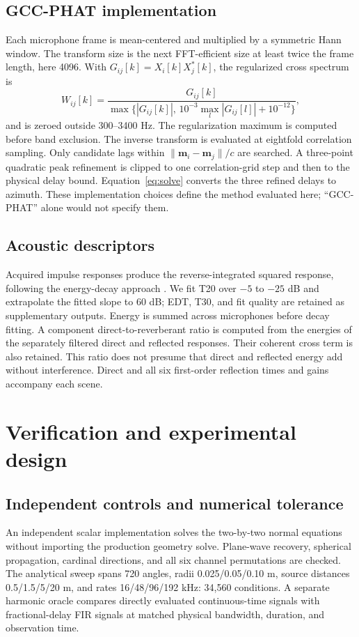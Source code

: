 \documentclass[10pt,a4paper,twocolumn]{article}
\begin{document}
\subsection{GCC-PHAT implementation}
Each microphone frame is mean-centered and multiplied by a symmetric Hann window. The transform size is the next FFT-efficient size at least twice the frame length, here 4096. With $G_{ij}[k]=X_i[k]X_j^*[k]$, the regularized cross spectrum is
\begin{equation}
 W_{ij}[k]=\frac{G_{ij}[k]}{\max\{|G_{ij}[k]|,\,10^{-3}\max_l|G_{ij}[l]|+10^{-12}\}},
\end{equation}
and is zeroed outside 300--3400 Hz. The regularization maximum is computed before band exclusion. The inverse transform is evaluated at eightfold correlation sampling. Only candidate lags within $\|\mathbf m_i-\mathbf m_j\|/c$ are searched. A three-point quadratic peak refinement is clipped to one correlation-grid step and then to the physical delay bound. Equation~\ref{eq:solve} converts the three refined delays to azimuth. These implementation choices define the method evaluated here; ``GCC-PHAT'' alone would not specify them.

\subsection{Acoustic descriptors}
Acquired impulse responses produce the reverse-integrated squared response, following the energy-decay approach \citep{schroeder}. We fit T20 over $-5$ to $-25$ dB and extrapolate the fitted slope to 60 dB; EDT, T30, and fit quality are retained as supplementary outputs. Energy is summed across microphones before decay fitting. A component direct-to-reverberant ratio is computed from the energies of the separately filtered direct and reflected responses. Their coherent cross term is also retained. This ratio does not presume that direct and reflected energy add without interference. Direct and all six first-order reflection times and gains accompany each scene.

\section{Verification and experimental design}
\subsection{Independent controls and numerical tolerance}
An independent scalar implementation solves the two-by-two normal equations without importing the production geometry solve. Plane-wave recovery, spherical propagation, cardinal directions, and all six channel permutations are checked. The analytical sweep spans 720 angles, radii 0.025/0.05/0.10 m, source distances 0.5/1.5/5/20 m, and rates 16/48/96/192 kHz: 34,560 conditions. A separate harmonic oracle compares directly evaluated continuous-time signals with fractional-delay FIR signals at matched physical bandwidth, duration, and observation time.
\end{document}
